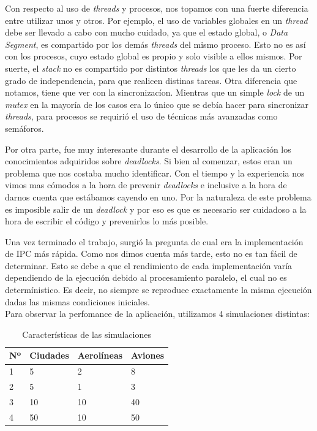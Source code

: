 \documentclass[a4paper,10pt]{article}
\begin{document}
Con respecto al uso de \textit{threads}  y procesos, nos topamos con una fuerte diferencia entre utilizar unos y otros. Por ejemplo, el uso de variables globales 
en un \textit{thread} debe ser llevado a cabo con mucho cuidado, ya que el estado global, o \textit{Data Segment}, es compartido por los demás \textit{threads} 
del mismo proceso. Esto no es así con los procesos, cuyo estado global es propio y solo visible a ellos mismos. Por suerte, el \textit{stack} no es compartido 
por distintos \textit{threads} los que les da un cierto grado de independencia, para que realicen distinas tareas. Otra diferencia que notamos, tiene que ver 
con la sincronizacíon. Mientras que un simple \textit{lock} de un \textit{mutex} en la mayoría de los casos era lo único que se debía hacer para sincronizar 
\textit{threads}, para procesos se requirió el uso de técnicas más avanzadas como semáforos.

Por otra parte, fue muy interesante durante el desarrollo de la aplicación los conocimientos adquiridos sobre \textit{deadlocks}.
Si bien al comenzar, estos eran un problema que nos costaba mucho identificar. Con el tiempo y la experiencia nos vimos mas cómodos
a la hora de prevenir \textit{deadlocks} e inclusive a la hora de darnos cuenta que estábamos cayendo en uno. Por la naturaleza de este
problema es imposible salir de un \textit{deadlock} y por eso es que es necesario ser cuidadoso a la hora de escribir el
código y prevenirlos lo más posible.

Una vez terminado el trabajo, surgió la pregunta de cual era la implementación de IPC más rápida. Como nos dimos cuenta más tarde, esto no es tan fácil de determinar. 
Esto se debe a que el rendimiento de cada implementación varía dependiendo de la ejecución debido al procesamiento paralelo, el cual no es determínistico. 
Es decir, no siempre se reproduce exactamente la misma ejecución dadas las mismas condiciones iniciales. \\

Para observar la perfomance de la aplicación, utilizamos 4 simulaciones distintas:

\begin{table}[H]
\begin{center}
\begin{tabular}{l|l|l|l}
Nº & Ciudades & Aerolíneas & Aviones \\
\hline
1 & 5 & 2 & 8 \\
2 & 5 & 1 & 3 \\
3 & 10 & 10 & 40 \\
4 & 50 & 10 & 50 \\
\end{tabular}
\caption{Características de las simulaciones}
\end{center}
\end{table}
\end{document}
